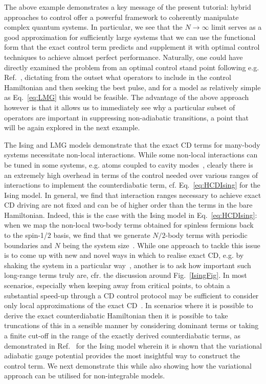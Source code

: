 The above example demonstrates a key message of the present tutorial: hybrid approaches to control offer a powerful framework to coherently manipulate complex quantum systems. In particular, we see that the $N\to \infty$ limit serves as a good approximation for sufficiently large systems that we can use the functional form that the exact control term predicts and supplement it with optimal control techniques to achieve almost perfect performance. Naturally, one could have directly examined the problem from an optimal control stand point following e.g. Ref.~\cite{KochEPJQT2015}, dictating from the outset what operators to include in the control Hamiltonian and then seeking the best pulse, and for a model as relatively simple as Eq.~\eqref{eq:LMG} this would be feasible. The advantage of the above approach however is that it allows us to immediately see why a particular subset of operators are important in suppressing non-adiabatic transitions, a point that will be again explored in the next example.

The Ising and LMG models demonstrate that the exact CD terms for many-body systems necessitate non-local interactions. While some non-local interactions can be tuned in some systems, e.g. atoms coupled to cavity modes~\cite{Vaidya2018Tunable}, clearly there is an extremely high overhead in terms of the control needed over various ranges of interactions to implement the counterdiabatic term, cf. Eq.~\eqref{eq:HCDIsing} for the Ising model. In general, we find that interaction ranges necessary to achieve exact CD driving are not fixed and can be of higher order than the terms in the bare Hamiltonian. Indeed, this is the case with the Ising model in Eq.~\eqref{eq:HCDIsing}: when we map the non-local two-body terms obtained for spinless fermions back to the spin-1/2 basis, we find that we generate $N/2$-body terms with periodic boundaries and $N$ being the system size~\cite{delCampo2012Assisted}. While one approach to tackle this issue is to come up with new and novel ways in which to realise exact CD, e.g. by shaking the system in a particular way~\cite{Claeys2019Floquet}, another is to ask how important such long-range terms truly are, cfr. the discussion around Fig.~\ref{IsingFig}. In most scenarios, especially when keeping away from critical points, to obtain a substantial speed-up through a CD control protocol  may be sufficient to consider only local approximations of the exact CD~\cite{COLD_PRXQ, Saberi2014}. In scenarios where it is possible to derive the exact counterdiabatic Hamiltonian then it is possible to take truncations of this in a sensible manner by considering dominant terms or taking a finite cut-off in the range of the exactly derived counterdiabatic terms, as demonstrated in Ref.~\cite{COLD_PRXQ} for the Ising model wherein it is shown that the variational adiabatic gauge potential provides the most insightful way to construct the control term. We next demonstrate this while also showing how the variational approach can be utilised for non-integrable models.

